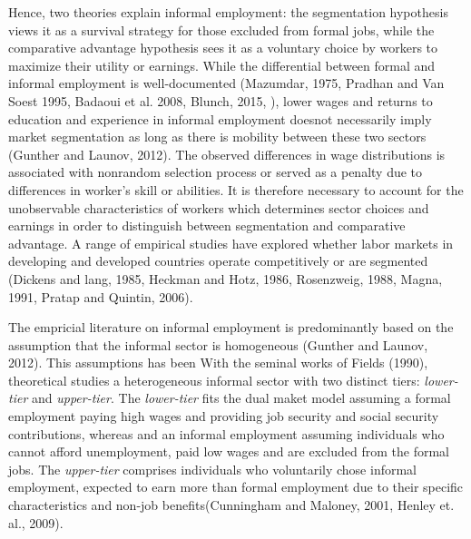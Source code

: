 Hence, two theories explain informal employment: the segmentation hypothesis views it as a survival strategy for those excluded from formal jobs, while the comparative advantage hypothesis sees it as a voluntary choice by workers to maximize their utility or earnings. While the differential between formal and informal employment is well-documented (Mazumdar, 1975, Pradhan and Van Soest 1995, Badaoui et al. 2008, Blunch, 2015, ), lower wages and returns to education and experience in informal employment doesnot necessarily imply market segmentation as long as there is mobility between these two sectors (Gunther and Launov, 2012).  The observed differences in wage distributions is associated with nonrandom selection process or served as a penalty due to differences in worker's skill or abilities. It is therefore necessary to account for the unobservable characteristics of workers which determines sector choices and earnings in order to distinguish between segmentation and comparative advantage. A range of empirical studies have explored whether labor markets in developing and developed countries operate competitively or are segmented (Dickens and lang, 1985, Heckman and Hotz, 1986, Rosenzweig, 1988, Magna, 1991, Pratap and Quintin, 2006). %

The empricial literature on informal employment is predominantly based on the assumption that the informal sector is homogeneous (Gunther and Launov, 2012). This assumptions has been With the seminal works of Fields (1990), theoretical studies a heterogeneous informal sector with two distinct tiers:  \textit{lower-tier} and \textit{upper-tier}. The  \textit{lower-tier} fits the dual maket model assuming a formal employment paying high wages and providing job security and social security contributions, whereas and an informal employment assuming individuals who cannot afford unemployment, paid low wages and are excluded from the formal jobs. The \textit{upper-tier} comprises individuals who voluntarily chose informal employment, expected to earn more than formal employment due to their specific characteristics and non-job benefits(Cunningham and Maloney, 2001, Henley et. al., 2009). 













